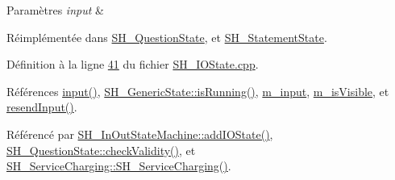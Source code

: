 \begin{DoxyParams}{Paramètres}
{\em input} & \\
\hline
\end{DoxyParams}


Réimplémentée dans \hyperlink{classSH__QuestionState_ab40b6202090d1afcc965e124b2deb88a}{S\-H\-\_\-\-Question\-State}, et \hyperlink{classSH__StatementState_ac9d6483521908224e4cb3765d680d113}{S\-H\-\_\-\-Statement\-State}.



Définition à la ligne \hyperlink{SH__IOState_8cpp_source_l00041}{41} du fichier \hyperlink{SH__IOState_8cpp_source}{S\-H\-\_\-\-I\-O\-State.\-cpp}.



Références \hyperlink{classSH__InOutState_a8e1b78069343122df7713624a1a5a100}{input()}, \hyperlink{classSH__GenericState_a5f731810dad0cacd28828ccbf1539e4e}{S\-H\-\_\-\-Generic\-State\-::is\-Running()}, \hyperlink{classSH__InOutState_ae43d6fdc62047f285913837648a1e883}{m\-\_\-input}, \hyperlink{classSH__InOutState_a8fd66b185c9a55f0e84daa97e2acf53a}{m\-\_\-is\-Visible}, et \hyperlink{classSH__InOutState_a1f00480afefd173002cf56d4c4128048}{resend\-Input()}.



Référencé par \hyperlink{classSH__InOutStateMachine_a2528cffddbe6f98c32ebef41423c0118}{S\-H\-\_\-\-In\-Out\-State\-Machine\-::add\-I\-O\-State()}, \hyperlink{classSH__QuestionState_a902be003650c33d954d707b2d3ee0bb9}{S\-H\-\_\-\-Question\-State\-::check\-Validity()}, et \hyperlink{classSH__ServiceCharging_afa5273d046049b1c2b020a6a19a8290b}{S\-H\-\_\-\-Service\-Charging\-::\-S\-H\-\_\-\-Service\-Charging()}.


